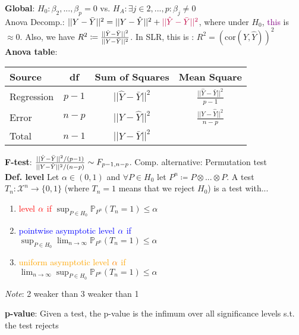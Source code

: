 \textbf{Global}: $H_0:\beta_2,...,\beta_p=0$ vs. $H_A:\exists j \in {2,...,p}:\beta_j \neq 0$\\
Anova Decomp.: $||Y-\Bar{Y}||^2=||Y-\hat{Y}||^2+ \mathcolor{purple}{||\hat{Y} - \Bar{Y}||^2}$, where under $H_0$, \textcolor{purple}{this} is $\approx 0$. Also, we have $R^2 \coloneqq \frac{||\hat{Y} - \Bar{Y}||^2}{||Y-\Bar{Y}||^2}$. In SLR, this is : $R^2 = (\text{cor}(Y, \hat{Y}))^2$\\
\textbf{Anova table}:
\vspace{-\baselineskip}
{\tiny
\begin{center}
\begin{tabular}{|l|c|c|c|}
\hline
Source & df & Sum of Squares & Mean Square \\
\hline
Regression & \(p-1\) & \(||\hat{Y}-\bar{Y}||^2\) & \(\frac{||\hat{Y}-\bar{Y}||^2}{p-1}\) \\
Error & \(n-p\) & \(||Y-\hat{Y}||^2\) & \(\frac{||Y-\hat{Y}||^2}{n-p}\) \\
\hline
Total & \(n-1\) & \(||Y-\bar{Y}||^2\) & \\
\hline
\end{tabular}
\end{center}
}
\vspace{-\baselineskip}
\textbf{F-test}: $\frac{||\hat{Y}-\Bar{Y}||^2/(p-1)}{||Y-\hat{Y}||^2/(n-p)} \sim F_{p-1, n-p}$. Comp. alternative: Permutation test\\
\textbf{Def. level} Let $\alpha \in (0,1)$ and $\forall P \in H_0$ let $P^n \coloneqq P \otimes ... \otimes P$. A test $T_n:\mathcal{X}^n \to \{0,1\}$ (where $T_n=1$ means that we reject $H_0$) is a test with...
\begin{enumerate}
    \item \textcolor{red}{level} $\mathcolor{red}{\alpha}$ \textcolor{red}{if} $\sup_{P\in H_0} \mathbb{P}_{P^n}(T_n=1) \leq \alpha$
    \item \textcolor{blue}{pointwise asymptotic level} $\mathcolor{blue}{\alpha}$ \textcolor{blue}{if}\\ $\sup_{P\in H_0}\lim_{n\to \infty}\mathbb{P}_{P^n}(T_n=1) \leq \alpha$
    \item \textcolor{orange}{uniform asymptotic level} $\mathcolor{orange}{\alpha}$ \textcolor{orange}{if}\\ $\lim_{n\to \infty}\sup_{P\in H_0}\mathbb{P}_{P^n}(T_n=1)\leq \alpha$
\end{enumerate}
\emph{Note}: 2 weaker than 3 weaker than 1

\textbf{p-value}: Given a test, the p-value is the infimum over all significance levels s.t. the test rejects
